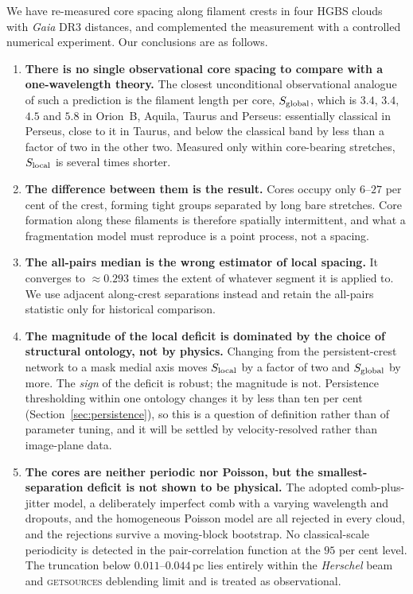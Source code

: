 \documentclass[usenatbib,twoside,twocolumn]{mnras}
\begin{document}
We have re-measured core spacing along filament crests in four HGBS clouds with \textit{Gaia} DR3 distances, and complemented the measurement with a controlled numerical experiment. Our conclusions are as follows.

\begin{enumerate}\setlength{\itemsep}{2pt}
\item \textbf{There is no single observational core spacing to compare with a one-wavelength theory.} The closest unconditional observational analogue of such a prediction is the filament length per core, $S_{\rm global}$, which is $3.4$, $3.4$, $4.5$ and $5.8$ in Orion~B, Aquila, Taurus and Perseus: essentially classical in Perseus, close to it in Taurus, and below the classical band by less than a factor of two in the other two. Measured only within core-bearing stretches, $S_{\rm local}$ is several times shorter.
\item \textbf{The difference between them is the result.} Cores occupy only $6$--$27$ per cent of the crest, forming tight groups separated by long bare stretches. Core formation along these filaments is therefore spatially intermittent, and what a fragmentation model must reproduce is a point process, not a spacing.
\item \textbf{The all-pairs median is the wrong estimator of local spacing.} It converges to $\approx0.293$ times the extent of whatever segment it is applied to. We use adjacent along-crest separations instead and retain the all-pairs statistic only for historical comparison.
\item \textbf{The magnitude of the local deficit is dominated by the choice of structural ontology, not by physics.} Changing from the persistent-crest network to a mask medial axis moves $S_{\rm local}$ by a factor of two and $S_{\rm global}$ by more. The \emph{sign} of the deficit is robust; the magnitude is not. Persistence thresholding within one ontology changes it by less than ten per cent (Section~\ref{sec:persistence}), so this is a question of definition rather than of parameter tuning, and it will be settled by velocity-resolved rather than image-plane data.
\item \textbf{The cores are neither periodic nor Poisson, but the smallest-separation deficit is not shown to be physical.} The adopted comb-plus-jitter model, a deliberately imperfect comb with a varying wavelength and dropouts, and the homogeneous Poisson model are all rejected in every cloud, and the rejections survive a moving-block bootstrap. No classical-scale periodicity is detected in the pair-correlation function at the $95$ per cent level. The truncation below $0.011$--$0.044$\,pc lies entirely within the \textit{Herschel} beam and \textsc{getsources} deblending limit and is treated as observational.

\end{enumerate}
\end{document}

